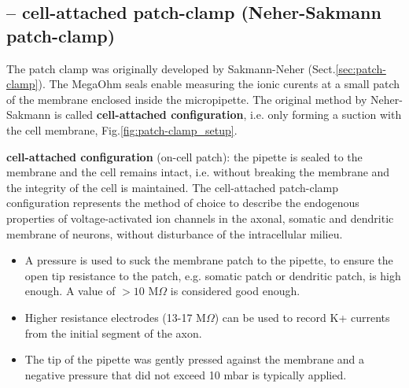 \subsection{-- cell-attached patch-clamp (Neher-Sakmann patch-clamp)}
\label{sec:patch-clamp-cell-attached}
\label{sec:Neher-Sakmann-patch-clamp}

The patch clamp was originally developed by Sakmann-Neher
(Sect.\ref{sec:patch-clamp}). The MegaOhm seals enable measuring the ionic
curents at a small patch of the membrane enclosed inside the micropipette.
The original method by Neher-Sakmann is called {\bf cell-attached
configuration}, i.e. only forming a suction with the cell
membrane, Fig.\ref{fig:patch-clamp_setup}. 


{\bf cell-attached configuration} (on-cell patch): the pipette is sealed to the
membrane and the cell remains intact, i.e. without breaking the membrane and the
integrity of the cell is maintained. The cell-attached patch-clamp configuration
 represents the method of choice to describe the endogenous properties of
voltage-activated ion channels in the axonal, somatic and dendritic membrane of
neurons, without disturbance of the intracellular milieu.
\begin{itemize}
  
  \item A pressure is used to suck the membrane patch to the pipette, to ensure
  the open tip resistance to the patch, e.g. somatic patch or dendritic patch,
  is high enough. A value of $> 10 $ M$\Omega$ is considered good enough.
  
  \item Higher resistance electrodes (13-17 M$\Omega$) can be used to record K+
  currents from the initial segment of the axon.

  \item The tip of the pipette was gently pressed against the membrane and a
  negative pressure that did not exceed 10 mbar is typically applied.

\end{itemize}


